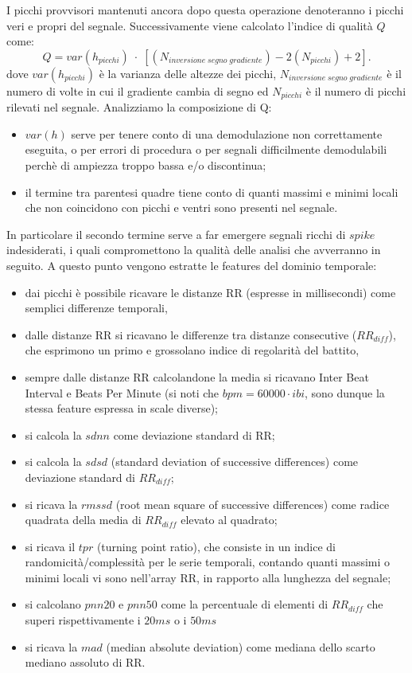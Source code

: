 \documentclass[12pt,a4paper, twoside, openright]{report}
\begin{document}
I picchi provvisori mantenuti ancora dopo questa operazione denoteranno i picchi veri e propri del segnale.
Successivamente viene calcolato l'indice di qualità $Q$ come:
\begin{equation}
	Q = var(h_{picchi})\;\cdot\;[(N_{inversione\;segno\;gradiente}) - 2(N_{picchi}) +2].
\end{equation}
dove $var(h_{picchi})$ è la varianza delle altezze dei picchi, $N_{inversione\;segno\;gradiente}$ è il numero di volte in cui il gradiente cambia di segno ed $N_{picchi}$ è il numero di picchi rilevati nel segnale.
Analizziamo la composizione di Q:\begin{itemize}
	\item $var(h)$ serve per tenere conto di una demodulazione non correttamente 					  eseguita, o per errori di procedura o per segnali difficilmente demodulabili 				  perchè di ampiezza troppo bassa e/o discontinua;
	\item il termine tra parentesi quadre tiene conto di quanti massimi e minimi locali 		  che non coincidono con picchi e ventri sono presenti nel segnale. 
\end{itemize}
In particolare il secondo termine serve a far emergere segnali ricchi di $spike$ indesiderati, i quali compromettono la qualità delle analisi che avverranno in seguito.
A questo punto vengono estratte le features del dominio temporale:\begin{itemize}
	\item dai picchi è possibile ricavare le distanze RR (espresse in millisecondi) 				  come semplici differenze temporali,
	\item dalle distanze RR si ricavano le differenze tra distanze consecutive 						  ($RR_{diff}$), che esprimono un primo e grossolano indice di regolarità del 				  battito,
	\item sempre dalle distanze RR calcolandone la media si ricavano Inter Beat 					  Interval e Beats Per Minute (si noti che $bpm = 60000\cdot ibi$, sono dunque 				  la stessa feature espressa in scale diverse);
	\item si calcola la $sdnn$ come deviazione standard di RR;
	\item si calcola la $sdsd$ (standard deviation of successive differences) come 					  deviazione standard di $RR_{diff}$;
	\item si ricava la $rmssd$ (root mean square of successive differences) come 					  radice quadrata della media di $RR_{diff}$ elevato al quadrato;
	\item si ricava il $tpr$ (turning point ratio), che consiste in un indice di 					  randomicità/complessità per le serie temporali, contando quanti massimi o 				  minimi locali vi sono nell'array RR, in rapporto alla lunghezza del segnale;
	\item si calcolano $pnn20$ e $pnn50$ come la percentuale di elementi di 				  	  	  $RR_{diff}$ che superi rispettivamente i $20ms$ o i $50ms$
	\item si ricava la $mad$ (median absolute deviation) come mediana dello scarto 					  mediano assoluto di RR.
\end{itemize}
\end{document}
